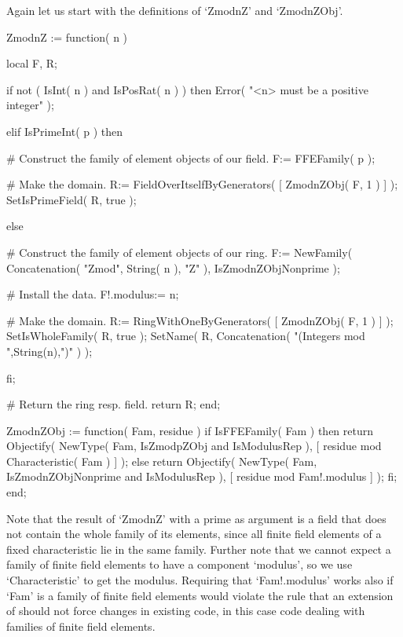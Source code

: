 Again let us start with the definitions of `ZmodnZ' and `ZmodnZObj'.

\begintt
    ZmodnZ := function( n )

        local F, R;

        if not ( IsInt( n ) and IsPosRat( n ) ) then
          Error( "<n> must be a positive integer" );

        elif IsPrimeInt( p ) then

          # Construct the family of element objects of our field.
          F:= FFEFamily( p );

          # Make the domain.
          R:= FieldOverItselfByGenerators( [ ZmodnZObj( F, 1 ) ] );
          SetIsPrimeField( R, true );

        else

          # Construct the family of element objects of our ring.
          F:= NewFamily( Concatenation( "Zmod", String( n ), "Z" ),
                         IsZmodnZObjNonprime );
  
          # Install the data.
          F!.modulus:= n;
  
          # Make the domain.
          R:= RingWithOneByGenerators( [ ZmodnZObj( F, 1 ) ] );
          SetIsWholeFamily( R, true );
          SetName( R, Concatenation( "(Integers mod ",String(n),")" ) );

        fi;

        # Return the ring resp. field.
        return R;
    end;


    ZmodnZObj := function( Fam, residue )
    if IsFFEFamily( Fam ) then
      return Objectify( NewType( Fam,     IsZmodpZObj
                                      and IsModulusRep ),
                        [ residue mod Characteristic( Fam ) ] );
    else
      return Objectify( NewType( Fam,     IsZmodnZObjNonprime
                                      and IsModulusRep ),
                        [ residue mod Fam!.modulus ] );
    fi;
    end;
\endtt

Note that the result of `ZmodnZ' with a prime as argument is a field that
does not contain the whole family of its elements, since all finite field
elements of a fixed characteristic lie in the same family.
Further note that we cannot expect a family of finite field elements
to have a component `modulus',
so we use `Characteristic' to get the modulus.
Requiring that `Fam!.modulus' works also if `Fam' is a family of
finite field elements would violate the rule
that an extension of {\GAP} should not force changes in existing code,
in this case code dealing with families of finite field elements.

